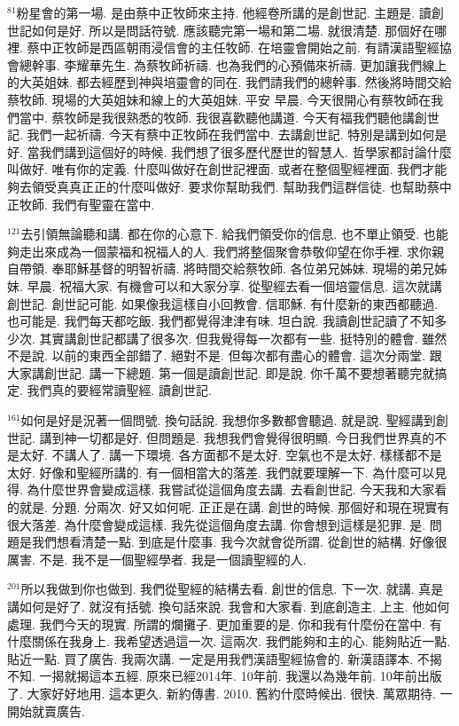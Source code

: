 \documentclass{book}
\begin{document}
$^{81}$粉星會的第一場.
是由蔡中正牧師來主持.
他經卷所講的是創世記.
主題是.
讀創世記如何是好.
所以是問話符號.
應該聽完第一場和第二場.
就很清楚.
那個好在哪裡.
蔡中正牧師是西區朝雨浸信會的主任牧師.
在培靈會開始之前.
有請漢語聖經協會總幹事.
李耀華先生.
為蔡牧師祈禱.
也為我們的心預備來祈禱.
更加讓我們線上的大英姐妹.
都去經歷到神與培靈會的同在.
我們請我們的總幹事.
然後將時間交給蔡牧師.
現場的大英姐妹和線上的大英姐妹.
平安 早晨.
今天很開心有蔡牧師在我們當中.
蔡牧師是我很熟悉的牧師.
我很喜歡聽他講道.
今天有福我們聽他講創世記.
我們一起祈禱.
今天有蔡中正牧師在我們當中.
去講創世記.
特別是講到如何是好.
當我們講到這個好的時候.
我們想了很多歷代歷世的智慧人.
哲學家都討論什麼叫做好.
唯有你的定義.
什麼叫做好在創世記裡面.
或者在整個聖經裡面.
我們才能夠去領受真真正正的什麼叫做好.
要求你幫助我們.
幫助我們這群信徒.
也幫助蔡中正牧師.
我們有聖靈在當中.

$^{121}$去引領無論聽和講.
都在你的心意下.
給我們領受你的信息.
也不單止領受.
也能夠走出來成為一個蒙福和祝福人的人.
我們將整個聚會恭敬仰望在你手裡.
求你親自帶領.
奉耶穌基督的明智祈禱.
將時間交給蔡牧師.
各位弟兄姊妹.
現場的弟兄姊妹.
早晨.
祝福大家.
有機會可以和大家分享.
從聖經去看一個培靈信息.
這次就講創世記.
創世記可能.
如果像我這樣自小回教會.
信耶穌.
有什麼新的東西都聽過.
也可能是.
我們每天都吃飯.
我們都覺得津津有味.
坦白說.
我讀創世記讀了不知多少次.
其實講創世記都講了很多次.
但我覺得每一次都有一些.
挺特別的體會.
雖然不是說.
以前的東西全部錯了.
絕對不是.
但每次都有盡心的體會.
這次分兩堂.
跟大家講創世記.
講一下總題.
第一個是讀創世記.
即是說.
你千萬不要想著聽完就搞定.
我們真的要經常讀聖經.
讀創世記.

$^{161}$如何是好是況著一個問號.
換句話說.
我想你多數都會聽過.
就是說.
聖經講到創世記.
講到神一切都是好.
但問題是.
我想我們會覺得很明顯.
今日我們世界真的不是太好.
不講人了.
講一下環境.
各方面都不是太好.
空氣也不是太好.
樣樣都不是太好.
好像和聖經所講的.
有一個相當大的落差.
我們就要理解一下.
為什麼可以見得.
為什麼世界會變成這樣.
我嘗試從這個角度去講.
去看創世記.
今天我和大家看的就是.
分題.
分兩次.
好又如何呢.
正正是在講.
創世的時候.
那個好和現在現實有很大落差.
為什麼會變成這樣.
我先從這個角度去講.
你會想到這樣是犯罪.
是.
問題是我們想看清楚一點.
到底是什麼事.
我今次就會從所謂.
從創世的結構.
好像很厲害.
不是.
我不是一個聖經學者.
我是一個讀聖經的人.

$^{201}$所以我做到你也做到.
我們從聖經的結構去看.
創世的信息.
下一次.
就講.
真是講如何是好了.
就沒有括號.
換句話來說.
我會和大家看.
到底創造主.
上主.
他如何處理.
我們今天的現實.
所謂的爛攤子.
更加重要的是.
你和我有什麼份在當中.
有什麼關係在我身上.
我希望透過這一次.
這兩次.
我們能夠和主的心.
能夠貼近一點.
貼近一點.
買了廣告.
我兩次講.
一定是用我們漢語聖經協會的.
新漢語譯本.
不揭不知.
一揭就揭這本五經.
原來已經2014年.
10年前.
我還以為幾年前.
10年前出版了.
大家好好地用.
這本更久.
新約傳書.
2010.
舊約什麼時候出.
很快.
萬眾期待.
一開始就賣廣告.
\end{document}

